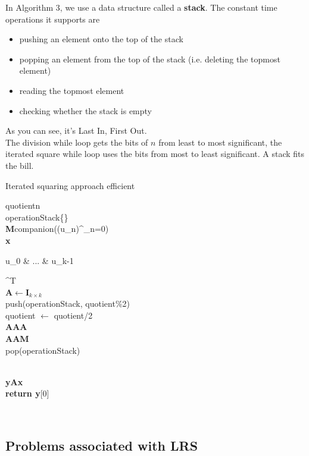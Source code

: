 \documentclass[a4paper,12pt]{article}
\numberwithin{definition}{section}
\numberwithin{mytheorem}{subsection}
\begin{document}
In Algorithm 3, we use a data structure called a \textbf{stack}. The constant time operations it supports
are
\begin{itemize}
\item pushing an element onto the top of the stack
\item popping an element from the top of the stack (i.e. deleting the topmost element)
\item reading the topmost element
\item checking whether the stack is empty
\end{itemize}
As you can see, it’s Last In, First Out.\\
The division while loop gets the bits of $n$ from least to most significant, the iterated square while
loop uses the bits from most to least significant. A stack fits the bill.\\
\begin{algorithm}[ht]
\caption{Iterated squaring approach \textsf{efficient}}
\SetAlgoLined
\DontPrintSemicolon
{}
\textsf{quotient}\longleftarrow n\\
\textsf{operationStack}\longleftarrow \{\}\\
\textbf{M}\longleftarrow \textsf{companion}((u_n)^\infty_{n=0})\\
\textbf{x}\longleftarrow \begin{bmatrix} u_0 & ... & u_{k-1} \end{bmatrix}^{T}\\
\textbf{A}$\longleftarrow$$\textbf{I}_{k\times k}$\\
{\textsf{push(operationStack, quotient\%2)\\
quotient $\longleftarrow$ quotient/2}}\\
{
\textbf{A}\longleftarrow\textbf{A}\cdot\textbf{A}\\
{\textbf{A}\longleftarrow\textbf{A}\cdot\textbf{M}}\\
\EndIf
\textsf{pop(operationStack)}}

\\
\textbf{y}\longleftarrow\textbf{Ax}\\
\textbf{return y}[0] 
\end{algorithm}
\\

\subsection{Problems associated with LRS}
\end{document}
